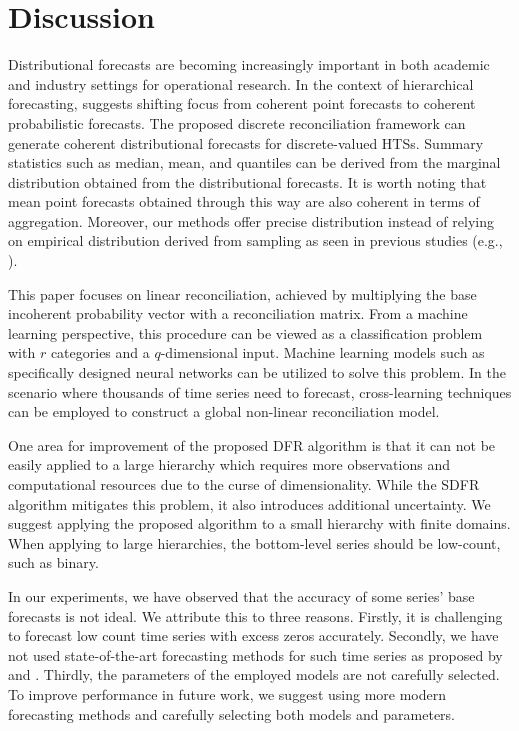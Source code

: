 \documentclass[a4paper,review,12pt,authoryear]{elsarticle}
\begin{document}
     \section{Discussion}

    

     Distributional forecasts are becoming increasingly important in both academic and industry settings for operational research. In the context of hierarchical forecasting, \cite{kolassaWeWantCoherent2022} suggests shifting focus from coherent point forecasts to coherent probabilistic forecasts. 
     The proposed discrete reconciliation framework can generate coherent distributional forecasts for discrete-valued HTSs.  
     Summary statistics such as median, mean, and quantiles can be derived from the marginal distribution obtained from the distributional forecasts. 
     It is worth noting that mean point forecasts obtained through this way are also coherent in terms of aggregation.
     Moreover, our methods offer precise distribution instead of relying on empirical distribution derived from sampling as seen in previous studies (e.g., \citealp{jeonProbabilisticForecastReconciliation2019,coraniProbabilisticReconciliationCount2022}).

     This paper focuses on linear reconciliation, achieved by multiplying the base incoherent probability vector with a reconciliation matrix. 
     From a machine learning perspective, this procedure can be viewed as a classification problem with $r$ categories and a $q$-dimensional input. Machine learning models such as specifically designed neural networks can be utilized to solve this problem. 
     In the scenario where thousands of time series need to forecast, cross-learning techniques can be employed to construct a global non-linear reconciliation model. 

     One area for improvement of the proposed DFR algorithm is that it can not be easily applied to a large hierarchy which requires more observations and computational resources due to the curse of dimensionality.
     While the SDFR algorithm mitigates this problem, it also introduces additional uncertainty. 
     We suggest applying the proposed algorithm to a small hierarchy with finite domains. 
     When applying to large hierarchies, the bottom-level series should be low-count, such as binary.

     In our experiments, we have observed that the accuracy of some series' base forecasts is not ideal. 
     We attribute this to three reasons. Firstly, it is challenging to forecast low count time series with excess zeros accurately. 
     Secondly, we have not used state-of-the-art forecasting methods for such time series as proposed by \cite{berryBayesianForecastingMany2020a} and \cite{weiEmpiricalLikelihoodRatio2021}. 
     Thirdly, the parameters of the employed models are not carefully selected. 
     To improve performance in future work, we suggest using more modern forecasting methods and carefully selecting both models and parameters.
\end{document}
